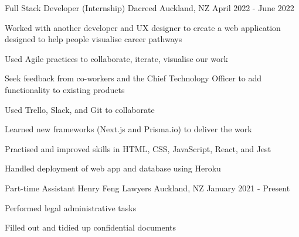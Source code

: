 

\begin{cventries}
  \cventry
    {Full Stack Developer (Internship)} %
    {Dacreed} %
    {Auckland, NZ} %
    {April 2022 - June 2022} %
    {
      \begin{cvitems} %
        \item {Worked with another developer and UX designer to create a web application designed to help people visualise career pathways}
        \item {Used Agile practices to collaborate, iterate, visualise our work}
        \item {Seek feedback from co-workers and the Chief Technology Officer to add functionality to existing products}
        \item {Used Trello, Slack, and Git to collaborate}
        \item {Learned new frameworks (Next.js and Prisma.io) to deliver the work}
        \item {Practised and improved skills in HTML, CSS, JavaScript, React, and Jest}
        \item {Handled deployment of web app and database using Heroku}
      \end{cvitems}
    }

  \cventry
    {Part-time Assistant} %
    {Henry Feng Lawyers} %
    {Auckland, NZ} %
    {January 2021 - Present} %
    {
      \begin{cvitems} %
        \item {Performed legal administrative tasks}
        \item {Filled out and tidied up confidential documents}
      \end{cvitems}
    }


\end{cventries}

